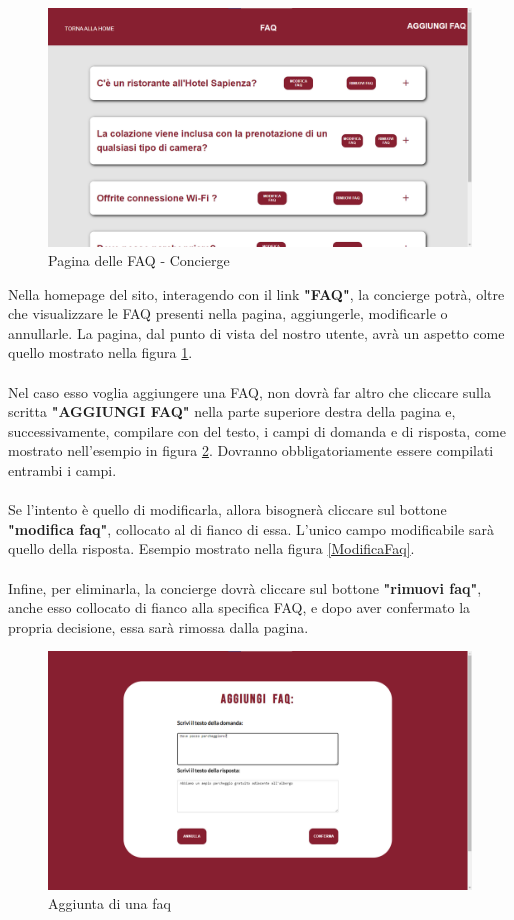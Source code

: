 \documentclass [a4paper, 12pt]{book}
\begin{document}
\begin{figure}[h]
\centering
\includegraphics[scale=0.25]{FaqStaff.png}
\caption{Pagina delle FAQ - Concierge}
\label{FaqStaff}
\end{figure}
Nella homepage del sito, interagendo con il link \textbf{"FAQ"}, la concierge potrà, oltre che visualizzare le FAQ presenti nella pagina, aggiungerle, modificarle o annullarle. La pagina, dal punto di vista del nostro utente, avrà un aspetto come quello mostrato nella figura \ref{FaqStaff}.\\\\
Nel caso esso voglia aggiungere una FAQ, non dovrà far altro che cliccare sulla scritta \textbf{"AGGIUNGI FAQ"} nella parte superiore destra della pagina e, successivamente, compilare con del testo, i campi di domanda e di risposta, come mostrato nell'esempio in figura \ref{AggiungiFaq}. Dovranno obbligatoriamente essere compilati entrambi i campi.\\\\
Se l'intento è quello di modificarla, allora bisognerà cliccare sul bottone \textbf{"modifica faq"}, collocato al di fianco di essa. L'unico campo modificabile sarà quello della risposta. Esempio mostrato nella figura \ref{ModificaFaq}.\\\\
Infine, per eliminarla, la concierge dovrà cliccare sul bottone \textbf{"rimuovi faq"}, anche esso collocato di fianco alla specifica FAQ, e dopo aver confermato la propria decisione, essa sarà rimossa dalla pagina. 

\begin{figure}[h]
\centering
\includegraphics[scale=0.3]{AggiungiFaq.png}
\caption{Aggiunta di una faq}
\label{AggiungiFaq}
\end{figure}\newpage
\end{document}
